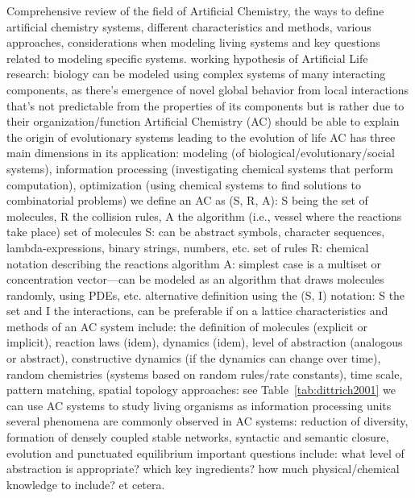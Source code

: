 \markdownRendererDocumentBegin
{} Comprehensive review of the field of Artificial Chemistry, the ways to define artificial chemistry systems, different characteristics and methods, various approaches, considerations when modeling living systems and key questions related to modeling specific systems.\markdownRendererInterblockSeparator
{}\markdownRendererUlBegin
\markdownRendererUlItem working hypothesis of Artificial Life research: biology can be modeled using complex systems of many interacting components, as there’s emergence of novel global behavior from local interactions that’s not predictable from the properties of its components but is rather due to their organization/function\markdownRendererUlItemEnd 
\markdownRendererUlItem Artificial Chemistry (AC) should be able to explain the origin of evolutionary systems leading to the evolution of life\markdownRendererUlItemEnd 
\markdownRendererUlItem AC has three main dimensions in its application: modeling (of biological/evolutionary/social systems), information processing (investigating chemical systems that perform computation), optimization (using chemical systems to find solutions to combinatorial problems)\markdownRendererUlItemEnd 
\markdownRendererUlItem we define an AC as (S, R, A): S being the set of molecules, R the collision rules, A the algorithm (i.e., vessel where the reactions take place)\markdownRendererUlItemEnd 
\markdownRendererUlItem set of molecules S: can be abstract symbols, character sequences, lambda-expressions, binary strings, numbers, etc.\markdownRendererUlItemEnd 
\markdownRendererUlItem set of rules R: chemical notation describing the reactions\markdownRendererUlItemEnd 
\markdownRendererUlItem algorithm A: simplest case is a multiset or concentration vector—can be modeled as an algorithm that draws molecules randomly, using PDEs, etc.\markdownRendererUlItemEnd 
\markdownRendererUlItem alternative definition using the (S, I) notation: S the set and I the interactions, can be preferable if on a lattice\markdownRendererUlItemEnd 
\markdownRendererUlItem characteristics and methods of an AC system include: the definition of molecules (explicit or implicit), reaction laws (idem), dynamics (idem), level of abstraction (analogous or abstract), constructive dynamics (if the dynamics can change over time), random chemistries (systems based on random rules/rate constants), time scale, pattern matching, spatial topology\markdownRendererUlItemEnd 
\markdownRendererUlItem approaches: see Table~\ref{tab:dittrich2001}\markdownRendererUlItemEnd 
\markdownRendererUlItem we can use AC systems to study living organisms as information processing units\markdownRendererUlItemEnd 
\markdownRendererUlItem several phenomena are commonly observed in AC systems: reduction of diversity, formation of densely coupled stable networks, syntactic and semantic closure, evolution and punctuated equilibrium\markdownRendererUlItemEnd 
\markdownRendererUlItem important questions include: what level of abstraction is appropriate? which key ingredients? how much physical/chemical knowledge to include? et cetera.\markdownRendererUlItemEnd 
\markdownRendererUlEnd \markdownRendererDocumentEnd